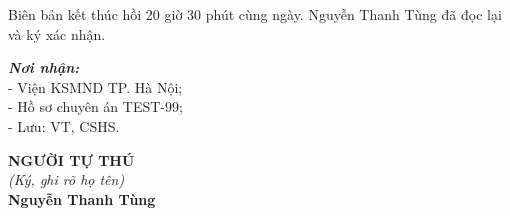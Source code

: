 \documentclass[12pt,a4paper]{article}
\begin{document}
\vspace{0.6cm}
\noindent Biên bản kết thúc hồi 20 giờ 30 phút cùng ngày. Nguyễn Thanh Tùng đã đọc lại và ký xác nhận.

\vspace{0.8cm}

\noindent
\begin{minipage}[t]{0.45\textwidth}
    \small
    \textbf{\textit{Nơi nhận:}}\\
    - Viện KSMND TP. Hà Nội;\\
    - Hồ sơ chuyên án TEST-99;\\
    - Lưu: VT, CSHS.
\end{minipage}
\hfill
\begin{minipage}[t]{0.5\textwidth}
    \begin{center}
        \small
        \textbf{NGƯỜI TỰ THÚ}\\
        \textit{(Ký, ghi rõ họ tên)}\\[1.5cm]
        \textbf{Nguyễn Thanh Tùng}
    \end{center}
\end{minipage}
\end{document}
